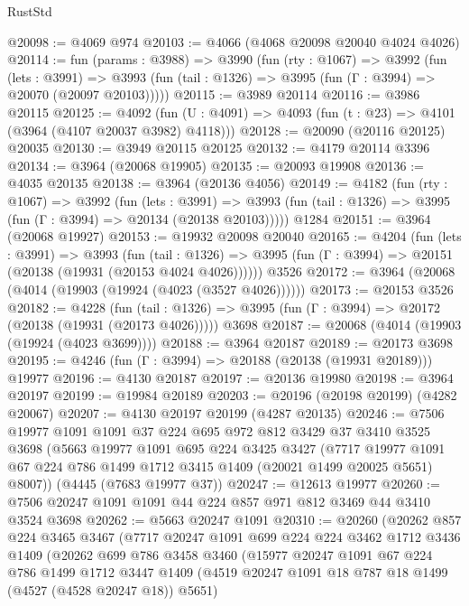 \begin{lexlean}{RustStd}
\begin{coremodule}
{\begin{coremodule}
{{{{{{{{{{{{{{{{{{{{{{{{{{{{{{{{{{{{{{@20098 := @4069 @974
@20103 := @4066 (@4068 @20098 @20040 @4024 @4026)
@20114 := fun (params : @3988) =>
  @3990
    (fun (rty : @1067) =>
    @3992
      (fun (lets : @3991) =>
      @3993 (fun (tail : @1326) => @3995 (fun (Γ : @3994) => @20070 (@20097 @20103)))))
@20115 := @3989 @20114
@20116 := @3986 @20115
@20125 := @4092
    (fun (U : @4091) => @4093 (fun (t : @23) => @4101 (@3964 (@4107 @20037 @3982) @4118)))
@20128 := @20090 (@20116 @20125) @20035
@20130 := @3949 @20115 @20125
@20132 := @4179 @20114 @3396
@20134 := @3964 (@20068 @19905)
@20135 := @20093 @19908
@20136 := @4035 @20135
@20138 := @3964 (@20136 @4056)
@20149 := @4182
    (fun (rty : @1067) =>
    @3992
      (fun (lets : @3991) =>
      @3993 (fun (tail : @1326) => @3995 (fun (Γ : @3994) => @20134 (@20138 @20103)))))
    @1284
@20151 := @3964 (@20068 @19927)
@20153 := @19932 @20098 @20040
@20165 := @4204
    (fun (lets : @3991) =>
    @3993
      (fun (tail : @1326) =>
      @3995 (fun (Γ : @3994) => @20151 (@20138 (@19931 (@20153 @4024 @4026))))))
    @3526
@20172 := @3964 (@20068 (@4014 (@19903 (@19924 (@4023 (@3527 @4026))))))
@20173 := @20153 @3526
@20182 := @4228
    (fun (tail : @1326) => @3995 (fun (Γ : @3994) => @20172 (@20138 (@19931 (@20173 @4026)))))
    @3698
@20187 := @20068 (@4014 (@19903 (@19924 (@4023 @3699))))
@20188 := @3964 @20187
@20189 := @20173 @3698
@20195 := @4246 (fun (Γ : @3994) => @20188 (@20138 (@19931 @20189))) @19977
@20196 := @4130 @20187
@20197 := @20136 @19980
@20198 := @3964 @20197
@20199 := @19984 @20189
@20203 := @20196 (@20198 @20199) (@4282 @20067)
@20207 := @4130 @20197 @20199 (@4287 @20135)
@20246 := @7506
    @19977
    @1091
    @1091
    @37
    @224
    @695
    @972
    @812
    @3429
    @37
    @3410
    @3525
    @3698
    (@5663
      @19977
      @1091
      @695
      @224
      @3425
      @3427
      (@7717 @19977 @1091 @67 @224 @786 @1499 @1712 @3415 @1409 (@20021 @1499 @20025 @5651) @8007))
    (@4445 (@7683 @19977 @37))
@20247 := @12613 @19977
@20260 := @7506 @20247 @1091 @1091 @44 @224 @857 @971 @812 @3469 @44 @3410 @3524 @3698
@20262 := @5663 @20247 @1091
@20310 := @20260
    (@20262
      @857
      @224
      @3465
      @3467
      (@7717
        @20247
        @1091
        @699
        @224
        @224
        @3462
        @1712
        @3436
        @1409
        (@20262
          @699
          @786
          @3458
          @3460
          (@15977
            @20247
            @1091
            @67
            @224
            @786
            @1499
            @1712
            @3447
            @1409
            (@4519 @20247 @1091 @18 @787 @18 @1499 (@4527 (@4528 @20247 @18)) @5651)
}}}}}}}}}}}}}}}}}}}}}}}}}}}}}}}}}}}}}}
\end{coremodule}}
\end{coremodule}
\end{lexlean}
